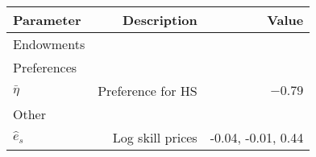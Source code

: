 \begin{tabular}{lrr}
\hline
Parameter & Description  & Value  \\
\hline
Endowments &   &   \\
Preferences &   &   \\
$\bar{\eta}$ & Preference for HS  & $-0.79$  \\
Other &   &   \\
$\hat{e}_{s}$ & Log skill prices  & -0.04, -0.01, 0.44  \\
\hline
\end{tabular}%
